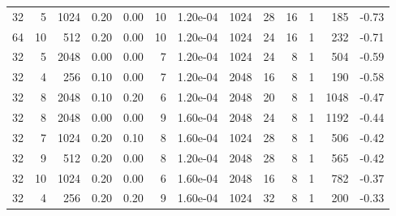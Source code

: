 \begin{appendices}
\begin{table}
\begin{tabular}{rrrrrrrrrrrrr}
\midrule
32 & 5 & 1024 & 0.20 & 0.00 & 10 & 1.20e-04 & 1024 & 28 & 16 & 1 & 185 & -0.73 \\
64 & 10 & 512 & 0.20 & 0.00 & 10 & 1.20e-04 & 1024 & 24 & 16 & 1 & 232 & -0.71 \\
32 & 5 & 2048 & 0.00 & 0.00 & 7 & 1.20e-04 & 1024 & 24 & 8 & 1 & 504 & -0.59 \\
32 & 4 & 256 & 0.10 & 0.00 & 7 & 1.20e-04 & 2048 & 16 & 8 & 1 & 190 & -0.58 \\
32 & 8 & 2048 & 0.10 & 0.20 & 6 & 1.20e-04 & 2048 & 20 & 8 & 1 & 1048 & -0.47 \\
32 & 8 & 2048 & 0.00 & 0.00 & 9 & 1.60e-04 & 2048 & 24 & 8 & 1 & 1192 & -0.44 \\
32 & 7 & 1024 & 0.20 & 0.10 & 8 & 1.60e-04 & 1024 & 28 & 8 & 1 & 506 & -0.42 \\
32 & 9 & 512 & 0.20 & 0.00 & 8 & 1.20e-04 & 2048 & 28 & 8 & 1 & 565 & -0.42 \\
32 & 10 & 1024 & 0.20 & 0.00 & 6 & 1.60e-04 & 2048 & 16 & 8 & 1 & 782 & -0.37 \\
32 & 4 & 256 & 0.20 & 0.20 & 9 & 1.60e-04 & 1024 & 32 & 8 & 1 & 200 & -0.33 \\
\bottomrule
\end{tabular}
\end{table}


\end{appendices}
